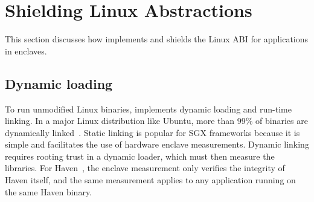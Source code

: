 \section{Shielding Linux Abstractions}
\label{sec:sgx:shield}


This section discusses how \graphenesgx{}
implements and shields the Linux ABI for applications in enclaves.




\subsection{Dynamic loading}
\label{sec:sgx:shield:linking}


To run unmodified Linux binaries,
\graphenesgx{} implements dynamic loading and run-time linking.
In a major Linux distribution like Ubuntu, more than 99\% of binaries are dynamically linked~\cite{tsai16apistudy}.
Static linking is popular for SGX frameworks because it is simple and 
facilitates the use of hardware enclave measurements. %
Dynamic linking requires rooting trust in a dynamic loader, which must then measure the libraries.
For Haven~\cite{baumann14haven}, the enclave measurement only verifies the integrity of Haven itself,
and the same measurement
applies to any application running on the same Haven binary.



